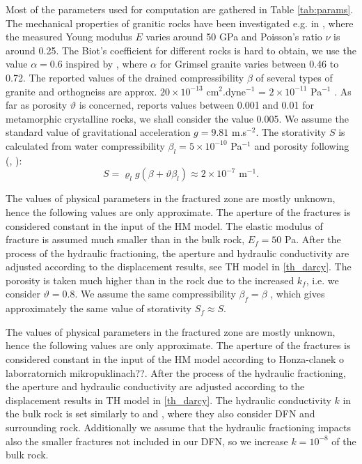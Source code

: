 \documentclass{article}
\newcommand{\todo}[1]{{\color{red}#1}}
\begin{document}
Most of the parameters used for computation are gathered in Table \ref{tab:params}.
The mechanical properties of granitic rocks have been investigated e.g. in \cite{Ljunggren1985}, where the measured Young modulus $E$ varies around 50 GPa and Poisson's ratio $\nu$ is around 0.25. The Biot's coefficient for different rocks is hard to obtain, we use the value $\alpha=0.6$ inspired by \cite{Selvadurai2019}, where $\alpha$ for Grimsel granite varies between 0.46 to 0.72.
The reported values of the drained compressibility $\beta$ of several types of granite and orthogneiss are approx. $20\times 10^{-13}$ cm${}^2$.dyne${}^{-1}$ = $2\times10^{-11}$ Pa${}^{-1}$ \cite{Zisman1933}.
As far as porosity $\vartheta$ is concerned, \cite{intera} reports values between 0.001 and 0.01 for metamorphic crystalline rocks, we shall consider the value 0.005.
We assume the standard value of gravitational acceleration $g=9.81$ m.s${}^{-2}$.
The storativity $S$ is calculated from water compressibility $\beta_l=5\times 10^{-10}$ Pa${}^{-1}$ and porosity following (\cite{Brace1968}, \cite{intera}):
\[ S = \varrho_l g(\beta + \vartheta\beta_l) \approx 2\times 10^{-7} \mbox{ m}^{-1}. \]


The values of physical parameters in the fractured zone are mostly unknown, hence the following values are only approximate. The aperture of the fractures is considered constant in the input of the HM model. The elastic modulus of fracture is assumed much smaller than in the bulk rock, $E_f=50$ Pa. After the process of the hydraulic fractioning, the aperture and hydraulic conductivity are adjusted according to the displacement results, see TH model in \eqref{th_darcy}. The porosity is taken much higher than in the rock due to the increased $k_f$, i.e. we consider $\vartheta=0.8$. We assume the same compressibility $\beta_f=\beta$ , which gives approximately the same value of storativity $S_f\approx S$.

The values of physical parameters in the fractured zone are mostly unknown, hence the following values are only approximate.
The aperture of the fractures is considered constant in the input of the HM model according to \todo{Honza-clanek o laborratornich mikropuklinach??}. %
After the process of the hydraulic fractioning, the aperture and hydraulic conductivity are adjusted according to the displacement results in TH model in \eqref{th_darcy}.
The hydraulic conductivity $k$ in the bulk rock is set similarly to \cite{Sperl2008} and \cite{Doonechaly2016}, where they also consider DFN and surrounding rock.
Additionally we assume that the hydraulic fractioning impacts also the smaller fractures not included in our DFN,
so we increase $k=10^{-8}$ of the bulk rock.
\end{document}
